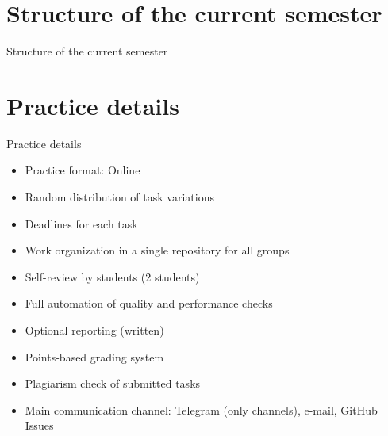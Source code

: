 \documentclass{beamer}
\begin{document}
\section{Structure of the current semester}\label{sec:structure-of-the-current-semester}

\begin{frame}{Structure of the current semester}
    \begin{center}
    \end{center}
\end{frame}

\section{Practice details}\label{sec:practice-details}

\begin{frame}{Practice details}
    \begin{itemize}
        \item Practice format: Online
        \item Random distribution of task variations
        \item Deadlines for each task
        \item Work organization in a single repository for all groups
        \item Self-review by students (2 students)
        \item Full automation of quality and performance checks
        \item Optional reporting (written)
        \item Points-based grading system
        \item Plagiarism check of submitted tasks
        \item Main communication channel: Telegram (only channels), e-mail, GitHub Issues
    \end{itemize}
\end{frame}
\end{document}
